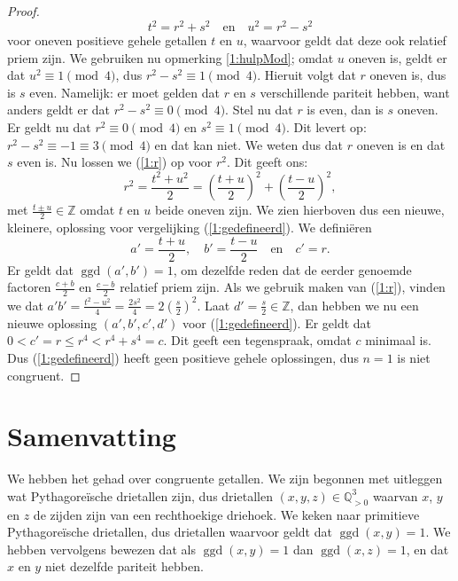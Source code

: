 \documentclass[12pt,reqno]{article}
\newcommand*{\ZZ}{\ensuremath{\mathbb{Z}}}
\newcommand*{\QQ}{\ensuremath{\mathbb{Q}}}
\theoremstyle{theorem}
\theoremstyle{definition}
\DeclareMathOperator{\ggd}{ggd}
\begin{document}
\begin{proof}
		\begin{equation}\label{1:r}
			t^2 = r^2 + s^2 \quad \text{en} \quad u^2 = r^2 - s^2
		\end{equation}
		voor oneven positieve gehele getallen $t$ en $u$, waarvoor geldt dat deze ook relatief priem zijn. We gebruiken nu opmerking \ref{1:hulpMod}; omdat $u$ oneven is, geldt er dat $u^2 \equiv 1 \pmod{4}$, dus $r^2 - s^2 \equiv 1 \pmod{4}$. Hieruit volgt dat $r$ oneven is, dus is $s$ even. Namelijk: er moet gelden dat $r$ en $s$ verschillende pariteit hebben, want anders geldt er dat $r^2 - s^2 \equiv 0 \pmod{4}$. Stel nu dat $r$ is even, dan is $s$ oneven. Er geldt nu dat $r^2 \equiv 0 \pmod{4}$ en $s^2 \equiv 1 \pmod{4}$. Dit levert op: $r^2 - s^2 \equiv -1 \equiv 3 \pmod{4}$ en dat kan niet. We weten dus dat $r$ oneven is en dat $s$ even is. Nu lossen we  (\ref{1:r}) op voor $r^2$. Dit geeft ons:
		\begin{equation*}
			r^2 = \frac{t^2 + u^2}{2} = \left( \frac{t+u}{2} \right)^2 + \left( \frac{t-u}{2} \right)^2,
		\end{equation*}
		met $\frac{t \pm u}{2} \in\ZZ$ omdat $t$ en $u$ beide oneven zijn. We zien hierboven dus een nieuwe, kleinere, oplossing voor vergelijking (\ref{1:gedefineerd}). We defini\"eren
		\begin{equation*}
			a' = \frac{t+u}{2}, \quad b' = \frac{t-u}{2} \quad \text{en} \quad c' = r.
		\end{equation*}
		Er geldt dat $\ggd(a',b') = 1$, om dezelfde reden dat de eerder genoemde factoren $\frac{c+b}{2}$ en $\frac{c-b}{2}$ relatief priem zijn. Als we gebruik maken van (\ref{1:r}), vinden we dat $a'b' = \frac{t^2 - u^2}{4} = \frac{2s^2}{4} = 2\left( \frac{s}{2} \right)^2$. Laat $d' = \frac{s}{2} \in\ZZ$, dan hebben we nu een nieuwe oplossing $(a', b', c', d')$ voor (\ref{1:gedefineerd}). Er geldt dat $0 < c'= r \leq r^4 < r^4 + s^4 = c$. Dit geeft een tegenspraak, omdat $c$ minimaal is. Dus (\ref{1:gedefineerd}) heeft geen positieve gehele oplossingen, dus $n=1$ is niet congruent.
	\end{proof}
	
	
	\section{Samenvatting}
	We hebben het gehad over congruente getallen. We zijn begonnen met uitleggen wat Pythagore\"ische drietallen zijn, dus drietallen $(x,y,z)\in \QQ_{>0}^3$ waarvan $x$, $y$ en $z$ de zijden zijn van een rechthoekige driehoek. We keken naar primitieve Pythagore\"ische drietallen, dus drietallen waarvoor geldt dat $\ggd(x,y)=1$. We hebben vervolgens bewezen dat als $\ggd(x,y)=1$ dan $\ggd(x,z)=1$, en dat $x$ en $y$ niet dezelfde pariteit hebben.
	
\end{document}
